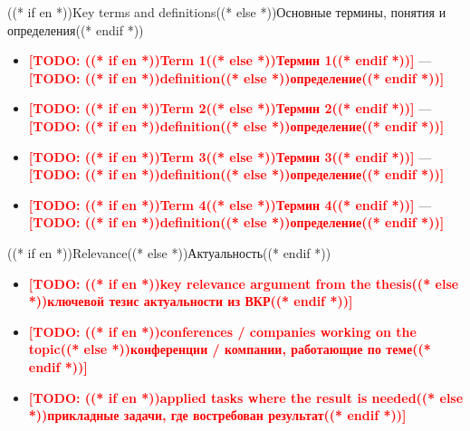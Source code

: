 \documentclass[aspectratio=169, 14pt]{beamer}
\newcommand{\todo}[1]{\textcolor{red}{\textbf{[TODO: #1]}}}
\begin{document}
\begin{frame}{((* if en *))Key terms and definitions((* else *))Основные термины, понятия и определения((* endif *))}
  \begin{itemize}
    \item \textbf{\todo{((* if en *))Term 1((* else *))Термин 1((* endif *))}} — \todo{((* if en *))definition((* else *))определение((* endif *))}
    \item \textbf{\todo{((* if en *))Term 2((* else *))Термин 2((* endif *))}} — \todo{((* if en *))definition((* else *))определение((* endif *))}
    \item \textbf{\todo{((* if en *))Term 3((* else *))Термин 3((* endif *))}} — \todo{((* if en *))definition((* else *))определение((* endif *))}
    \item \textbf{\todo{((* if en *))Term 4((* else *))Термин 4((* endif *))}} — \todo{((* if en *))definition((* else *))определение((* endif *))}
  \end{itemize}
\end{frame}

\begin{frame}{((* if en *))Relevance((* else *))Актуальность((* endif *))}
  \begin{itemize}
    \item \todo{((* if en *))key relevance argument from the thesis((* else *))ключевой тезис актуальности из ВКР((* endif *))}
    \item \todo{((* if en *))conferences / companies working on the topic((* else *))конференции / компании, работающие по теме((* endif *))}
    \item \todo{((* if en *))applied tasks where the result is needed((* else *))прикладные задачи, где востребован результат((* endif *))}
  \end{itemize}
\end{frame}
\end{document}

